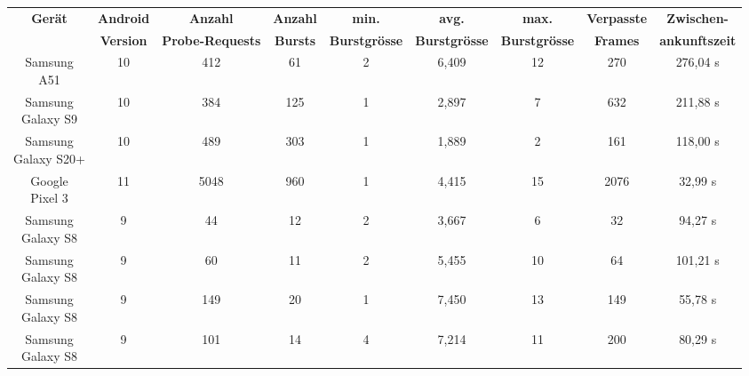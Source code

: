\begin{landscape}
    \begin{table}[h!]
        \small
	    \centering
        \begin{tabular}{|c|c|c|c|c|c|c|c|c|}
            \hline
            \textbf{Gerät} & \textbf{Android}  & \textbf{Anzahl} & \textbf{Anzahl} & \textbf{min.} & \textbf{avg.} & \textbf{max.} & \textbf{Verpasste} & \textbf{Zwischen-}\\
             & \textbf{Version} & \textbf{Probe-Requests} & \textbf{Bursts} & \textbf{Burstgrösse} & \textbf{Burstgrösse} & \textbf{Burstgrösse} & \textbf{Frames} & \textbf{ankunftszeit}\\
            \hline
            \shortstack{Samsung \\ A51 } &  10 & \phantom{0}412 & \phantom{00}61 & 2 & \phantom{0}6,409 & 12 & \phantom{0}270 & 276,04 s \\
            \hline
            \shortstack{Samsung \\ Galaxy S9 } &  10 & \phantom{0}384 & \phantom{0}125 & 1 & \phantom{0}2,897 & \phantom{0}7 & \phantom{0}632 & 211,88 s \\
            \hline
            \shortstack{Samsung \\ Galaxy S20+ } &  10 & \phantom{0}489 & \phantom{0}303 & 1 & \phantom{0}1,889 & \phantom{0}2 & \phantom{0}161 & 118,00 s \\
            \hline
            \shortstack{Google \\ Pixel 3 } &  11 & 5048 & \phantom{0}960 & 1 & \phantom{0}4,415 & 15 & 2076 & 32,99 s \\
            \hline
            \shortstack{Samsung \\ Galaxy S8 } & \phantom{0}9 & \phantom{00}44 &\phantom{00} 12 & 2 & \phantom{0}3,667 & \phantom{0}6 & \phantom{00}32 & \phantom{0}94,27 s \\
            \hline
            \shortstack{Samsung \\ Galaxy S8 } &  \phantom{0}9 & \phantom{00}60 & \phantom{00}11 & 2 & \phantom{0}5,455 & 10 & \phantom{00}64 & 101,21 s \\
            \hline
            \shortstack{Samsung \\ Galaxy S8 } &  \phantom{0}9 & \phantom{0}149 & \phantom{00}20 & 1 & \phantom{0}7,450 & 13 & \phantom{0}149 & \phantom{0}55,78 s \\
            \hline
            \shortstack{Samsung \\ Galaxy S8 } &  \phantom{0}9 & \phantom{0}101 & \phantom{00}14 & 4 & \phantom{0}7,214 & 11 & \phantom{0}200 & \phantom{0}80,29 s \\

\end{tabular}
\end{table}
\end{landscape}
